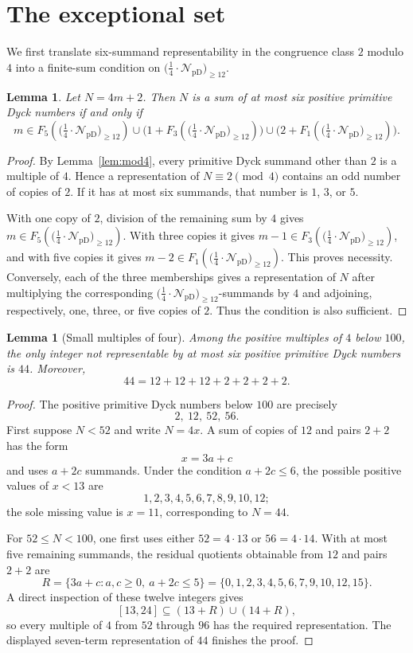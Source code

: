 \documentclass[12pt]{article}
\theoremstyle{plain}
\newtheorem{lemma}[theorem]{Lemma}
\newcommand{\Pset}{\bigl(\tfrac14\cdot
  \mathcal N_{\mathrm{pD}}\bigr)_{\ge 12}}
\begin{document}
\section{The exceptional set}\label{sec:exceptions}

We first translate six-summand representability in the congruence class
$2$ modulo $4$ into a finite-sum condition on $\Pset$.

\begin{lemma}\label{lem:sixcriterion}
Let $N=4m+2$.  Then $N$ is a sum of at most six positive primitive Dyck
numbers if and only if
\[
 m\in F_5(\Pset)
 \cup\bigl(1+F_3(\Pset)\bigr)
 \cup\bigl(2+F_1(\Pset)\bigr).
\]
\end{lemma}

\begin{proof}
By Lemma~\ref{lem:mod4}, every primitive Dyck summand other than $2$ is
a multiple of $4$.  Hence a representation of $N\equiv2\pmod 4$ contains
an odd number of copies of $2$.  If it has at most six summands, that
number is $1$, $3$, or $5$.

With one copy of $2$, division of the remaining sum by $4$ gives
$m\in F_5(\Pset)$.  With three copies it gives
$m-1\in F_3(\Pset)$, and with five copies it gives
$m-2\in F_1(\Pset)$.  This proves necessity.  Conversely, each of the
three memberships gives a representation of $N$ after multiplying the
corresponding $\Pset$-summands by $4$ and adjoining, respectively, one,
three, or five copies of $2$.  Thus the condition is also sufficient.
\end{proof}

\begin{lemma}[Small multiples of four]\label{lem:smallmultiples}
Among the positive multiples of $4$ below $100$, the only integer not
representable by at most six positive primitive Dyck numbers is $44$.
Moreover,
\[
 44=12+12+12+2+2+2+2.
\]
\end{lemma}

\begin{proof}
The positive primitive Dyck numbers below $100$ are precisely
\[
 2,\ 12,\ 52,\ 56.
\]
First suppose $N<52$ and write $N=4x$.  A sum of copies of $12$ and
pairs $2+2$ has the form
\[
 x=3a+c
\]
and uses $a+2c$ summands.  Under the condition $a+2c\leq6$, the possible
positive values of $x<13$ are
\[
 1,2,3,4,5,6,7,8,9,10,12;
\]
the sole missing value is $x=11$, corresponding to $N=44$.

For $52\leq N<100$, one first uses either $52=4\cdot13$ or
$56=4\cdot14$.  With at most five remaining summands, the residual
quotients obtainable from $12$ and pairs $2+2$ are
\[
 R=\{3a+c:a,c\geq0,\ a+2c\leq5\}
   =\{0,1,2,3,4,5,6,7,9,10,12,15\}.
\]
A direct inspection of these twelve integers gives
\[
 [13,24]\subseteq(13+R)\cup(14+R),
\]
so every multiple of $4$ from $52$ through $96$ has the required
representation.  The displayed seven-term representation of $44$
finishes the proof.
\end{proof}
\end{document}

